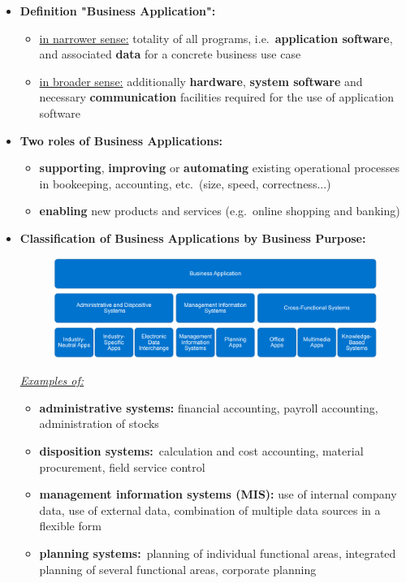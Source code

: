 \documentclass[ieeetran]{article}
\begin{document}
\begin{itemize}
  \item \textbf{Definition "Business Application":}
	  \begin{itemize}
	    \item \underline{in narrower sense:} totality of all programs, i.e.\ \textbf{application software}, and associated \textbf{data} for a concrete business use case
	    \item \underline{in broader sense:} additionally \textbf{hardware}, \textbf{system software} and necessary \textbf{communication} facilities required for the use of application software
	  \end{itemize}
\item \textbf{Two roles of Business Applications:}
	\begin{itemize}
	  \item \textbf{supporting}, \textbf{improving} or \textbf{automating} existing operational processes in bookeeping, accounting, etc.\ (size, speed, correctness...)
	\item \textbf{enabling} new products and services (e.g.\ online shopping and banking)
	\end{itemize}
\item \textbf{Classification of Business Applications by Business Purpose:}
	\begin{figure}[h!]
	  \centering
	  \includegraphics[width=0.5\linewidth]{classofba.png}
	  \label{fig:classofba_png}
	\end{figure}

\textit{\underline{Examples of:}}

\begin{itemize}
  \item \textbf{administrative systems:} financial accounting, payroll accounting, administration of stocks
\item \textbf{disposition systems:}\ calculation and cost accounting, material procurement, field service control
\item \textbf{management information systems (MIS):} use of internal company data, use of external data, combination of multiple data sources in a flexible form
\item \textbf{planning systems:}\ planning of individual functional areas, integrated planning of several functional areas, corporate planning


\end{itemize}
\end{itemize}
\end{document}
